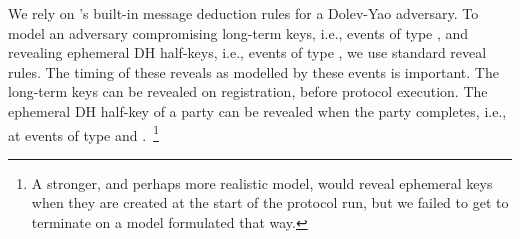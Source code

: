We rely on \mTamarin's{} built-in message deduction rules for a Dolev-Yao adversary.
%
To model an adversary compromising long-term keys, i.e., events of type
\mRevLTK{}, and revealing ephemeral DH half-keys, i.e., events of type
\mRevEph{}, we use standard reveal rules.
%
%
The timing of these reveals as modelled by these events is important.
%
The long-term keys can be revealed on registration, before protocol execution.
%
The ephemeral DH half-key of a party can be revealed when the party completes,
i.e., at events of type \mIComplete{} and \mRComplete.~\footnote{A stronger, and perhaps more realistic model, would reveal ephemeral keys when they are
created at the start of the protocol run, but we failed to get \mTamarin{} to
terminate on a model formulated that way.}\\
%

